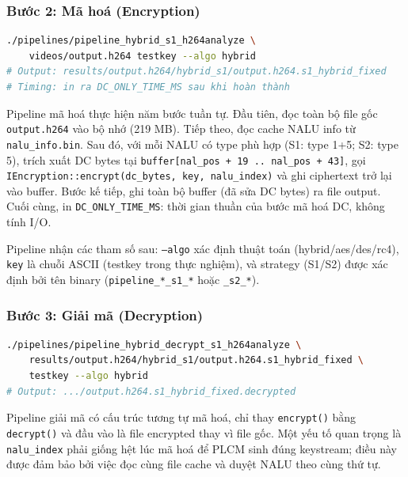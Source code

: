 \subsubsection{Bước 2: Mã hoá (Encryption)}

\begin{lstlisting}[language=bash, caption={Mã hoá DC bytes với strategy S1 và algo hybrid}]
./pipelines/pipeline_hybrid_s1_h264analyze \
    videos/output.h264 testkey --algo hybrid
# Output: results/output.h264/hybrid_s1/output.h264.s1_hybrid_fixed
# Timing: in ra DC_ONLY_TIME_MS sau khi hoàn thành
\end{lstlisting}

Pipeline mã hoá thực hiện năm bước tuần tự. Đầu tiên, đọc toàn bộ file gốc \texttt{output.h264} vào bộ nhớ (219 MB). Tiếp theo, đọc cache NALU info từ \texttt{nalu\_info.bin}. Sau đó, với mỗi NALU có type phù hợp (S1: type 1+5; S2: type 5), trích xuất DC bytes tại \texttt{buffer[nal\_pos + 19 .. nal\_pos + 43]}, gọi \texttt{IEncryption::encrypt(dc\_bytes, key, nalu\_index)} và ghi ciphertext trở lại vào buffer. Bước kế tiếp, ghi toàn bộ buffer (đã sửa DC bytes) ra file output. Cuối cùng, in \texttt{DC\_ONLY\_TIME\_MS}: thời gian thuần của bước mã hoá DC, không tính I/O.

Pipeline nhận các tham số sau: \texttt{--algo} xác định thuật toán (hybrid/aes/des/rc4), \texttt{key} là chuỗi ASCII (testkey trong thực nghiệm), và strategy (S1/S2) được xác định bởi tên binary (\texttt{pipeline\_*\_s1\_*} hoặc \texttt{\_s2\_*}).

\subsubsection{Bước 3: Giải mã (Decryption)}

\begin{lstlisting}[language=bash, caption={Giải mã với cùng key và algo}]
./pipelines/pipeline_hybrid_decrypt_s1_h264analyze \
    results/output.h264/hybrid_s1/output.h264.s1_hybrid_fixed \
    testkey --algo hybrid
# Output: .../output.h264.s1_hybrid_fixed.decrypted
\end{lstlisting}

Pipeline giải mã có cấu trúc tương tự mã hoá, chỉ thay \texttt{encrypt()} bằng \texttt{decrypt()} và đầu vào là file encrypted thay vì file gốc. Một yếu tố quan trọng là \texttt{nalu\_index} phải giống hệt lúc mã hoá để PLCM sinh đúng keystream; điều này được đảm bảo bởi việc đọc cùng file cache và duyệt NALU theo cùng thứ tự.

